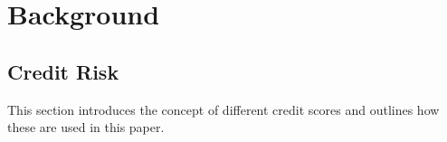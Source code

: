 \chapter{Background} \label{chpt: background}

    \section{Credit Risk}


        This section introduces the concept of different credit scores and outlines how these are used in this paper.  
    
        
            
            
